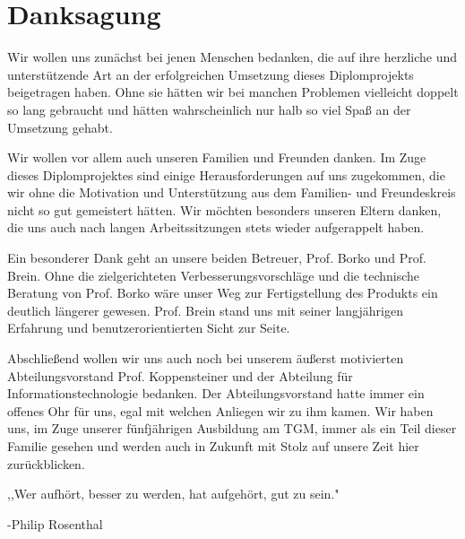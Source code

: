 \section*{Danksagung}
\cfoot{}
Wir wollen uns zunächst bei jenen Menschen bedanken, die auf ihre herzliche und unterstützende Art an der erfolgreichen Umsetzung dieses Diplomprojekts beigetragen haben. Ohne sie hätten wir bei manchen Problemen vielleicht doppelt so lang gebraucht und hätten wahrscheinlich nur halb so viel Spaß an der Umsetzung gehabt.

Wir wollen vor allem auch unseren Familien und Freunden danken. Im Zuge dieses Diplomprojektes sind einige Herausforderungen auf uns zugekommen, die wir ohne die Motivation und Unterstützung aus dem Familien- und Freundeskreis nicht so gut gemeistert hätten. Wir möchten besonders unseren Eltern danken, die uns auch nach langen Arbeitssitzungen stets wieder aufgerappelt haben.

Ein besonderer Dank geht an unsere beiden Betreuer, Prof. Borko und Prof. Brein. Ohne die zielgerichteten Verbesserungsvorschläge und die technische Beratung von Prof. Borko wäre unser Weg zur Fertigstellung des Produkts ein deutlich längerer gewesen. Prof. Brein stand uns mit seiner langjährigen Erfahrung und benutzerorientierten Sicht zur Seite.

Abschließend wollen wir uns auch noch bei unserem äußerst motivierten Abteilungsvorstand Prof. Koppensteiner und der Abteilung für Informationstechnologie bedanken. Der Abteilungsvorstand hatte immer ein offenes Ohr für uns, egal mit welchen Anliegen wir zu ihm kamen. Wir haben uns, im Zuge unserer fünfjährigen Ausbildung am TGM, immer als ein Teil dieser Familie gesehen und werden auch in Zukunft mit Stolz auf unsere Zeit hier zurückblicken.

,,Wer aufhört, besser zu werden, hat aufgehört, gut zu sein."

-Philip Rosenthal
